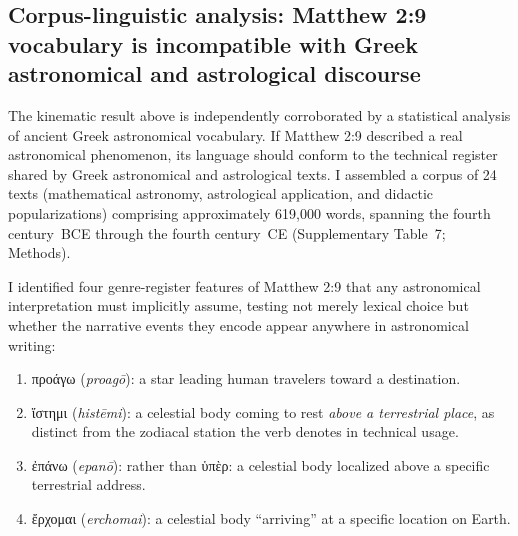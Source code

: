 \documentclass[sn-nature]{sn-jnl}
\newcommand{\grk}[1]{{\fontencoding{LGR}\selectfont #1}}
\newcommand{\grk}[1]{{\greekfont #1}}
\newcommand{\tr}[1]{\textit{#1}}
\begin{document}

\subsection{Corpus-linguistic analysis: Matthew 2:9 vocabulary is
  incompatible with Greek astronomical and astrological discourse}
\label{subsec:linguistics}

The kinematic result above is independently corroborated by
a statistical analysis of ancient Greek astronomical vocabulary. If Matthew
2:9 described a real astronomical phenomenon, its language should conform to
the technical register shared by Greek astronomical and astrological texts.
I assembled a corpus of 24 texts (mathematical astronomy, astrological
application, and didactic popularizations) comprising approximately 619,000
words, spanning the fourth century~BCE through the fourth century~CE
(Supplementary Table~7; Methods).

I identified four genre-register features of Matthew 2:9 that any
astronomical interpretation must implicitly assume, testing not merely lexical
choice but whether the narrative events they encode appear anywhere in
astronomical writing:
\begin{enumerate}
  \item[(A)] \grk{προάγω} (\tr{proag\={o}}): a star leading human
    travelers toward a destination.
  \item[(B)] \grk{ἵστημι} (\tr{hist\={e}mi}): a celestial body coming to
    rest \emph{above a terrestrial place}, as distinct from the zodiacal
    station the verb denotes in technical usage.
  \item[(C)] \grk{ἐπάνω} (\tr{epan\={o}}): rather than \grk{ὑπὲρ}:
    a celestial body localized above a specific terrestrial address.
  \item[(D)] \grk{ἔρχομαι} (\tr{erchomai}): a celestial body
    ``arriving'' at a specific location on Earth.
\end{enumerate}
\end{document}
